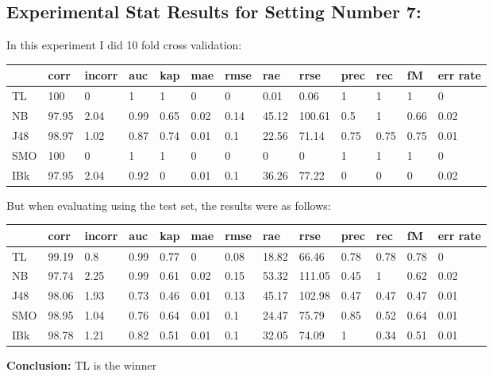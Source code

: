\documentclass[a4paper,12pt, english]{article}
\begin{document}
\subsection{Experimental Stat Results for Setting Number 7:}
In this experiment I did 10 fold cross validation:
\begin{small}
\begin{center}
    \begin{tabular}{ | l | l | l | l | l | l | l | l | l | l | l | l | l |}
    \hline
      	& corr & incorr  & auc & kap & mae & rmse & rae & rrse & prec & rec & fM & err rate\\ \hline
      	TL & 100 & 0 & 1 & 1 & 0 & 0 & 0.01 & 0.06 & 1 & 1 & 1 & 0\\ \hline
	NB & 97.95 & 2.04 & 0.99 & 0.65 & 0.02 & 0.14 & 45.12 & 100.61 & 0.5 & 1 & 0.66 & 0.02\\ \hline
	J48 & 98.97 & 1.02 & 0.87 & 0.74 & 0.01 & 0.1 & 22.56 & 71.14 & 0.75 & 0.75 & 0.75 & 0.01\\ \hline
	SMO & 100 & 0 & 1 & 1 & 0 & 0 & 0 & 0 & 1 & 1 & 1 & 0\\ \hline
	IBk & 97.95 & 2.04 & 0.92 & 0 & 0.01 & 0.1 & 36.26 & 77.22 & 0 & 0 & 0 & 0.02\\ \hline  
    \end{tabular}       
\end{center}
\end{small}

But when evaluating using the test set, the results were as follows:
\begin{small}
\begin{center}
    \begin{tabular}{ | l | l | l | l | l | l | l | l | l | l | l | l | l |}
    \hline
      	& corr & incorr  & auc & kap & mae & rmse & rae & rrse & prec & rec & fM & err rate\\ \hline
      	TL & 99.19 & 0.8 & 0.99 & 0.77 & 0 & 0.08 & 18.82 & 66.46 & 0.78 & 0.78 & 0.78 & 0\\ \hline
	NB & 97.74 & 2.25 & 0.99 & 0.61 & 0.02 & 0.15 & 53.32 & 111.05 & 0.45 & 1 & 0.62 & 0.02\\ \hline
	J48 & 98.06 & 1.93 & 0.73 & 0.46 & 0.01 & 0.13 & 45.17 & 102.98 & 0.47 & 0.47 & 0.47 & 0.01\\ \hline
	SMO & 98.95 & 1.04 & 0.76 & 0.64 & 0.01 & 0.1 & 24.47 & 75.79 & 0.85 & 0.52 & 0.64 & 0.01\\ \hline
	IBk & 98.78 & 1.21 & 0.82 & 0.51 & 0.01 & 0.1 & 32.05 & 74.09 & 1 & 0.34 & 0.51 & 0.01\\ \hline  
    \end{tabular}       
\end{center}
\end{small}
\textbf{Conclusion:} TL is the winner
\end{document}
